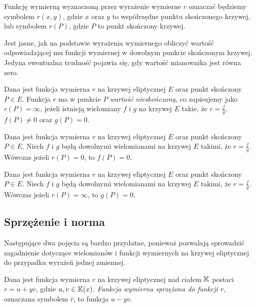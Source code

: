 \begin{remark}
Funkcję wymierną wyznaczoną przez wyrażenie wymierne $r$
oznaczać będziemy symbolem $r(x, y)$,
gdzie $x$ oraz $y$ to współrzędne punktu skończonego krzywej,
lub symbolem $r(P)$, gdzie $P$ to punkt skończony krzywej.
\end{remark}

\noindent
Jest jasne, jak na podstawie wyrażenia wymiernego
obliczyć wartość odpowiadającej mu funkcji wymiernej
w dowolnym punkcie skończonym krzywej.
Jedyna ewentualna trudność pojawia się,
gdy wartość mianownika jest równa zero.

\begin{definition}
Dana jest funkcja wymierna $r$ na krzywej eliptycznej $E$
oraz punkt skończony $P \in E$.
Funkcja $r$ ma w punkcie $P$ \emph{wartość nieskończoną},
co zapisujemy jako $r(P) = \infty$,
jeżeli istnieją wielomiany $f$ i $g$ na krzywej $E$ takie,
że $r = \frac{f}{g}$, $f(P) \neq 0$ oraz $g(P) = 0$.
\end{definition}

\begin{theorem}
Dana jest funkcja wymierna $r$ na krzywej eliptycznej $E$
oraz punkt skończony $P \in E$.
Niech $f$ i $g$ będą dowolnymi wielomianami na krzywej $E$ takimi,
że $r = \frac{f}{g}$.
Wówczas jeżeli $r(P) = 0$, to $f(P) = 0$.
\end{theorem}

\begin{theorem}
Dana jest funkcja wymierna $r$ na krzywej eliptycznej $E$
oraz punkt skończony $P \in E$.
Niech $f$ i $g$ będą dowolnymi wielomianami na krzywej $E$ takimi,
że $r = \frac{f}{g}$.
Wówczas jeżeli $r(P) = \infty$, to $g(P) = 0$.
\end{theorem}

\subsection*{Sprzężenie i norma}

\noindent
Następujące dwa pojęcia są bardzo przydatne,
ponieważ pozwalają sprowadzić
zagadnienie dotyczące wielomianów i funkcji wymiernych na krzywej eliptycznej
do przypadku wyrażeń jednej zmiennej.

\begin{definition}
Dana jest funkcja wymierna $r$ na krzywej eliptycznej nad ciałem $\mathbb{K}$
postaci $r = u + yv$, gdzie $u, v \in \mathbb{K}(x)$.
\emph{Funkcja wymierna sprzężona do funkcji $r$},
oznaczana symbolem $\overline{r}$,
to funkcja $u - yv$.
\end{definition}

